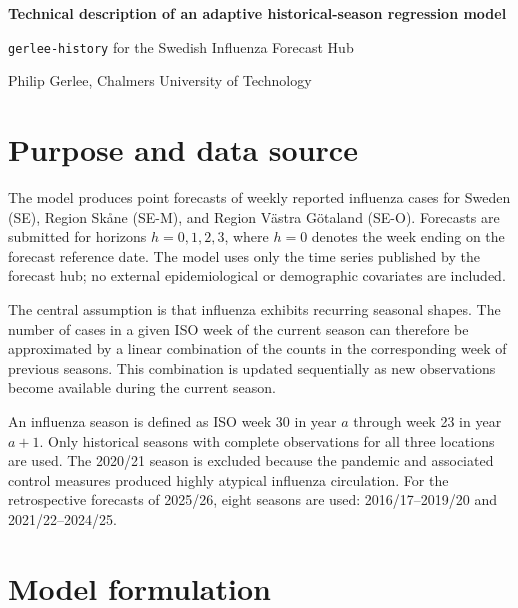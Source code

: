 \documentclass[10pt,a4paper]{article}
\newcommand{\modelname}{\texttt{gerlee-history}}
\begin{document}
\begin{center}
  {\Large\bfseries Technical description of an adaptive historical-season regression model}\par
  \vspace{0.3em}
  {\modelname{} for the Swedish Influenza Forecast Hub}\par
  \vspace{0.2em}
  Philip Gerlee, Chalmers University of Technology
\end{center}

\section*{Purpose and data source}

The model produces point forecasts of weekly reported influenza cases for
Sweden (SE), Region Skåne (SE-M), and Region Västra Götaland (SE-O). Forecasts
are submitted for horizons $h=0,1,2,3$, where $h=0$ denotes the week ending on
the forecast reference date. The model uses only the time series published by
the forecast hub; no external epidemiological or demographic covariates are
included.

The central assumption is that influenza exhibits recurring seasonal shapes.
The number of cases in a given ISO week of the current season can therefore be
approximated by a linear combination of the counts in the corresponding week
of previous seasons. This combination is updated sequentially as new
observations become available during the current season.

An influenza season is defined as ISO week 30 in year $a$ through week 23 in
year $a+1$. Only historical seasons with complete observations for all three
locations are used. The 2020/21 season is excluded because the pandemic and
associated control measures produced highly atypical influenza circulation.
For the retrospective forecasts of 2025/26, eight seasons are used:
2016/17--2019/20 and 2021/22--2024/25.

\section*{Model formulation}
\end{document}

